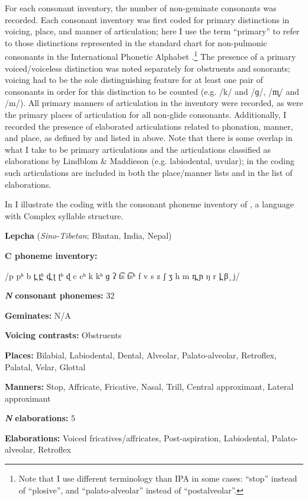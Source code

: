   For each consonant inventory, the number of non-geminate consonants was recorded. Each consonant inventory was first coded for primary distinctions in voicing, place, and manner of articulation; here I use the term ``primary'' to refer to those distinctions represented in the standard chart for non-pulmonic consonants in the International Phonetic Alphabet \citep{IPA2015}.\footnote{{Note that I use different terminology than IPA in some cases: ``stop'' instead of ``plosive'', and ``palato-alveolar'' instead of ``postalveolar''.}} The presence of a primary voiced/voiceless distinction was noted separately for obstruents and sonorants; voicing had to be the sole distinguishing feature for at least one pair of consonants in order for this distinction to be counted (e.g. /k/ and /ɡ/, /m̥/ and /m/). All primary manners of articulation in the inventory were recorded, as were the primary places of articulation for all non-glide consonants. Additionally, I recorded the presence of elaborated articulations related to phonation, manner, and place, as defined by \citet{LindblomMaddieson1988} and listed in  above. Note that there is some overlap in what I take to be primary articulations and the articulations classified as elaborations by Lindblom \& Maddieson (e.g. labiodental, uvular); in the coding such articulations are included in both the place/manner lists and in the list of elaborations.

  In  I illustrate the coding with the consonant phoneme inventory of , a language with Complex syllable structure.

\ea\label{ex:4.10}
  \textbf{Lepcha} (\textit{Sino-Tibetan}; Bhutan, India, Nepal)

\textbf{C phoneme inventory:} 

/p pʰ b t̪ t̪ʰ d̪ ʈ ʈʰ ɖ c cʰ k kʰ ɡ ʔ t͡s t͡sʰ f v s z ʃ ʒ h m n̪ ɲ ŋ r l̪ β ̞ j/

\textbf{\textit{N}} \textbf{consonant phonemes:} 32

\textbf{Geminates:} N/A

\textbf{Voicing contrasts:} Obstruents

\textbf{Places:} Bilabial, Labiodental, Dental, Alveolar, Palato-alveolar, Retroflex, Palatal, Velar, Glottal

\textbf{Manners:} Stop, Affricate, Fricative, Nasal, Trill, Central approximant, Lateral approximant

\textbf{\textit{N}} \textbf{elaborations:} 5

\textbf{Elaborations:} Voiced fricatives/affricates, Post-aspiration, Labiodental, Palato-alveolar, Retroflex
\z

